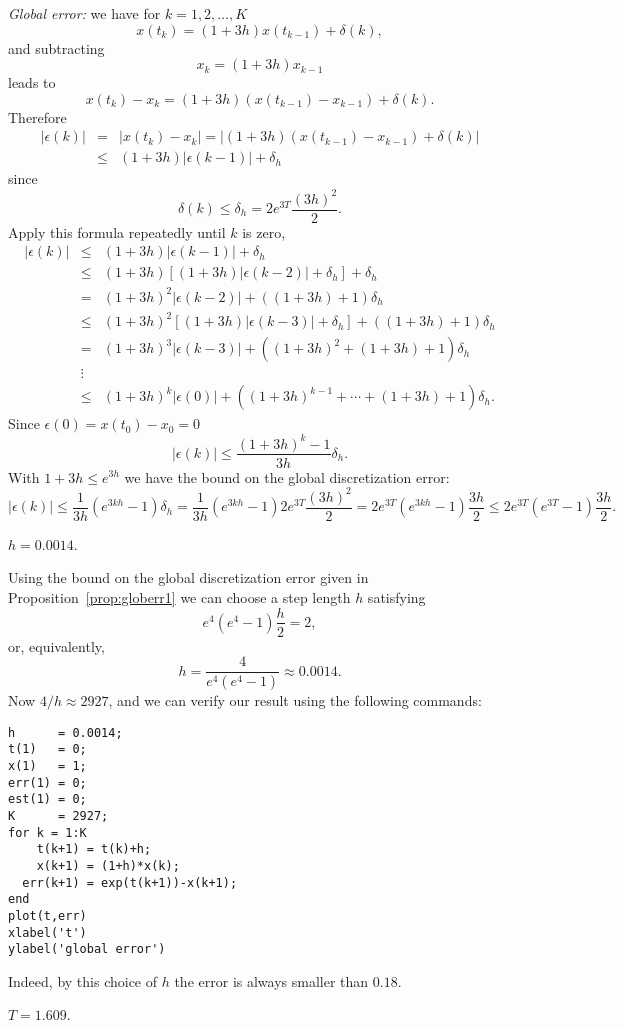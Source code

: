 \documentclass{ximera}
\begin{document}
{\em Global error:} we have for $k=1,2,\ldots,K$
\[
x(t_k)=(1+3h)x(t_{k-1})+\delta(k),
\]
and subtracting
\[
x_k = (1+3h)x_{k-1}
\]
leads to
\[
x(t_k) - x_k = (1+3h)(x(t_{k-1})-x_{k-1})+\delta(k).
\]
Therefore
\begin{eqnarray*}
|\epsilon(k)| & = & |x(t_k) - x_k| =
|(1+3h)(x(t_{k-1})-x_{k-1})+\delta(k)|\\
& \le & (1+3h)|\epsilon(k-1)|+\delta_h
\end{eqnarray*}
since
\[
\delta(k)\le \delta_h = 2e^{3T}\frac{(3h)^2}{2}.
\]
Apply this formula repeatedly until $k$ is zero,
\[
\begin{array}{rcl}
|\epsilon(k)|&\le&(1+3h)|\epsilon(k-1)|+\delta_h\\
&\le& (1+3h)[(1+3h)|\epsilon(k-2)|+\delta_h]+\delta_h\\
&=& (1+3h)^2|\epsilon(k-2)| + ((1+3h) + 1)\delta_h\\
&\le& (1+3h)^2[(1+3h)|\epsilon(k-3)|+\delta_h] + ((1+3h) + 1)\delta_h\\
&=& (1+3h)^3|\epsilon(k-3)| + ((1+3h)^2 + (1+3h) + 1)\delta_h\\
&\vdots& \\
&\le & (1+3h)^k|\epsilon(0)| + ((1+3h)^{k-1} +\cdots + (1+3h) + 1)\delta_h.
\end{array}
\]
Since $\epsilon(0)=x(t_0) - x_0=0$
\[
|\epsilon(k)| \le \frac{(1+3h)^k -1}{3h}\delta_h.
\]
With $1+3h\le e^{3h}$ we have the bound on the global discretization error:
\[
|\epsilon(k)| \le \frac{1}{3h} (e^{3kh}-1)\delta_h=
\frac{1}{3h}(e^{3kh}-1)2e^{3T}\frac{(3h)^2}{2} =
2e^{3T}(e^{3kh}-1)\frac{3h}{2}
\le 2e^{3T}(e^{3T}-1)\frac{3h}{2}.
\]

 \ans $h=0.0014$.

\soln Using the bound on the global discretization error
given in Proposition~\ref{prop:globerr1} we can choose a
step length $h$ satisfying
\[
e^4(e^4-1)\frac{h}{2} = 2,
\]
or, equivalently,
\[
h = \frac{4}{e^4(e^4-1)} \approx 0.0014.
\]
Now $4/h \approx 2927$, and we can verify our result using the
following \Matlab commands:
\begin{verbatim}
h      = 0.0014;
t(1)   = 0;
x(1)   = 1;
err(1) = 0;
est(1) = 0;
K      = 2927;
for k = 1:K
    t(k+1) = t(k)+h;
    x(k+1) = (1+h)*x(k);
  err(k+1) = exp(t(k+1))-x(k+1);
end
plot(t,err)
xlabel('t')
ylabel('global error')
\end{verbatim}
Indeed, by this choice of $h$ the error is always smaller than $0.18$.

 \ans $T=1.609$.
\end{document}
